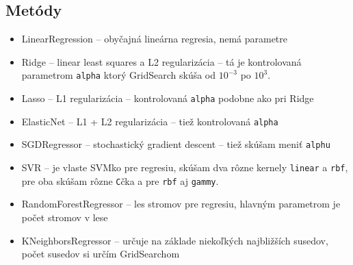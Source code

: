 \documentclass[xcolor={table}]{beamer}
\begin{document}
		\subsection{Metódy}
			\begin{frame}{}
				\begin{itemize}%
				\item LinearRegression -- obyčajná lineárna regresia, nemá parametre
				\item Ridge  -- linear least squares a L2 regularizácia -- tá je kontrolovaná parametrom \texttt{alpha} ktorý GridSearch skúša od $10^{-3}$ po $10^3$.
				\item Lasso -- L1 regularizácia -- kontrolovaná \texttt{alpha} podobne ako pri Ridge
				\item ElasticNet -- L1 + L2 regularizácia -- tiež kontrolovaná \texttt{alpha}
				\item SGDRegressor -- stochastický gradient descent -- tiež skúšam meniť \texttt{alphu}
				\item SVR -- je vlaste SVMko pre regresiu, skúšam dva rôzne kernely \texttt{linear} a \texttt{rbf}, pre oba skúšam rôzne \texttt{C}čka a pre \texttt{rbf} aj \texttt{gammy}.
				\item RandomForestRegressor -- les stromov pre regresiu, hlavným parametrom je počet stromov v lese
				\item KNeighborsRegressor -- určuje na základe niekoľkých najbližších susedov, počet susedov si určím GridSearchom
\end{itemize}
			\end{frame}            
\end{document}
